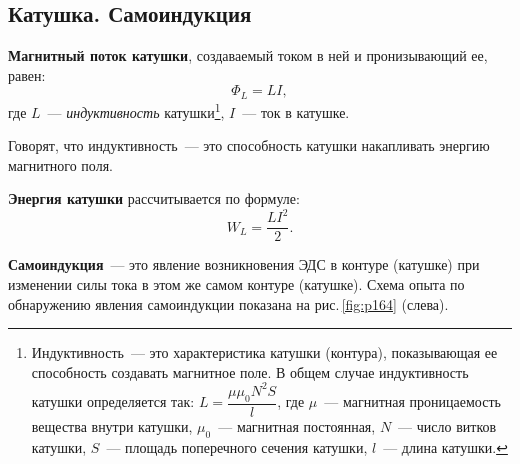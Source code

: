 \documentclass[main.tex]{subfiles}
\begin{document}

\pagestyle{empty}

\begin{NoHyper} %

\setcounter{section}{41
}
\addtocounter{section}{-1} 

\section{Катушка. Самоиндукция}



\textbf{Магнитный поток катушки}, создаваемый током в ней и пронизывающий ее, равен:
\begin{equation}
    \Phi_L=LI,
\end{equation}
где $L$~--- \emph{индуктивность} катушки\footnote{Индуктивность~--- это характеристика катушки (контура), показывающая ее способность создавать магнитное поле. В общем случае индуктивность катушки определяется так: $L=\dfrac{\mu\mu_0N^2S}{l}$, где $\mu$~--- магнитная проницаемость вещества внутри катушки, $\mu_0$~--- магнитная постоянная, $N$~--- число витков катушки, $S$~--- площадь поперечного сечения катушки, $l$~--- длина катушки.}, $I$~--- ток в катушке.



Говорят, что индуктивность~--- это способность катушки накапливать энергию магнитного поля.

\textbf{Энергия катушки} рассчитывается по формуле:
\begin{equation}
    W_L=\frac{LI^2}{2}.
\end{equation}

\textbf{Самоиндукция}~--- это явление возникновения ЭДС в контуре (катушке) при изменении силы тока в этом же самом контуре (катушке). Схема опыта по обнаружению явления самоиндукции показана на рис.\,\ref{fig:p164} (слева).




\end{NoHyper}
\end{document}
